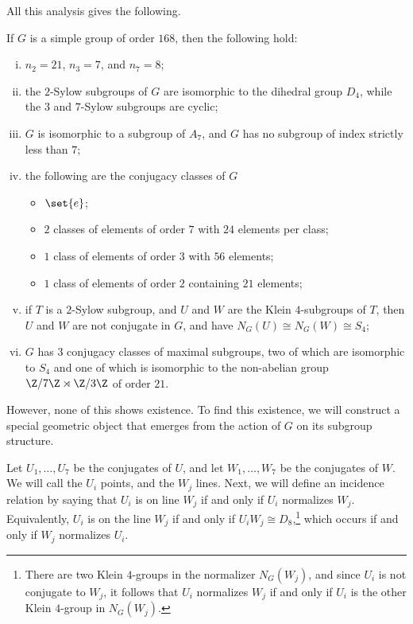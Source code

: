 \documentclass[10pt]{mypackage}
\begin{document}
All this analysis gives the following.
\begin{proposition}
  If $G$ is a simple group of order $168$, then the following hold:
  \begin{enumerate}[(i)]
    \item $n_2 = 21$, $n_3 = 7$, and $n_7 = 8$;
    \item the $2$-Sylow subgroups of $G$ are isomorphic to the dihedral group $D_4$, while the $3$ and $7$-Sylow subgroups are cyclic;
    \item $G$ is isomorphic to a subgroup of $A_7$, and $G$ has no subgroup of index strictly less than $7$;
    \item the following are the conjugacy classes of $G$
      \begin{itemize}
        \item $\set{e}$;
        \item $2$ classes of elements of order $7$ with $24$ elements per class;
        \item $1$ class of elements of order $3$ with $56$ elements;
        \item $1$ class of elements of order $2$ containing $21$ elements;
      \end{itemize}
    \item if $T$ is a $2$-Sylow subgroup, and $U$ and $W$ are the Klein $4$-subgroups of $T$, then $U$ and $W$ are not conjugate in $G$, and have $N_G(U)\cong N_G(W)\cong S_4$;
    \item $G$ has $3$ conjugacy classes of maximal subgroups, two of which are isomorphic to $S_4$ and one of which is isomorphic to the non-abelian group $\Z/7\Z\rtimes \Z/3\Z$ of order $21$.
  \end{enumerate}
\end{proposition}
However, none of this shows existence. To find this existence, we will construct a special geometric object that emerges from the action of $G$ on its subgroup structure.

Let $U_1,\dots,U_7$ be the conjugates of $U$, and let $W_1,\dots,W_7$ be the conjugates of $W$. We will call the $U_i$ points, and the $W_j$ lines. Next, we will define an incidence relation by saying that $U_i$ is on line $W_j$ if and only if $U_i$ normalizes $W_j$. Equivalently, $U_i$ is on the line $W_j$ if and only if $U_iW_j\cong D_8$,\footnote{There are two Klein $4$-groups in the normalizer $N_G\left( W_j \right)$, and since $U_i$ is not conjugate to $W_j$, it follows that $U_i$ normalizes $W_j$ if and only if $U_i$ is the other Klein $4$-group in $N_G\left( W_j \right)$.} which occurs if and only if $W_j$ normalizes $U_i$.
\end{document}
